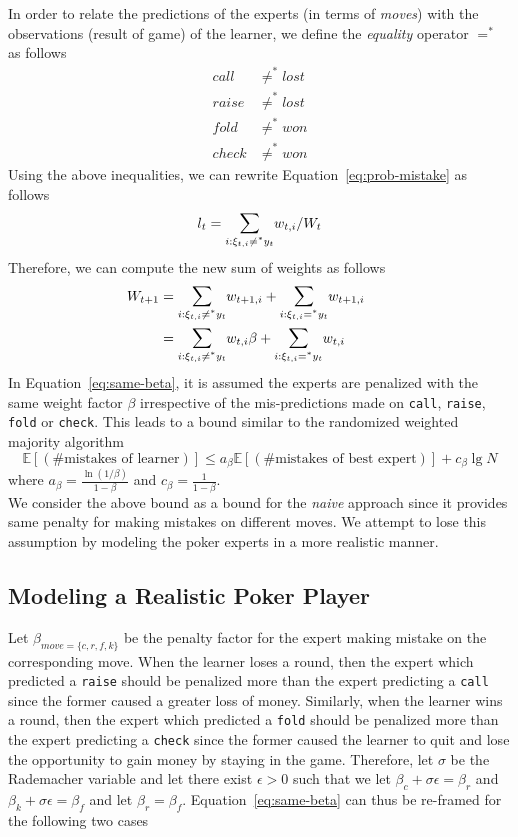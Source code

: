 \documentclass[12pt]{article}
\begin{document}
\noindent In order to relate the predictions of the experts (in terms of {\em moves}) with the
observations (result of game) of the learner, we define the {\em equality} operator
$=^*$ as follows
\begin{align*}
call &\neq^* lost\\
raise &\neq^* lost\\
fold &\neq^* won\\
check &\neq^* won
\end{align*}
\noindent Using the above inequalities, we can rewrite Equation~\ref{eq:prob-mistake} as follows
\begin{align}
l_t = \Sum_{i:\xi_{t,i}\neq^*y_t}w_{t,i}/W_t
\end{align}
\noindent Therefore, we can compute the new sum of weights as follows
\begin{align}
W_{t+1} &= \Sum_{i:\xi_{t,i}\neq^*y_t}w_{t+1,i} + \Sum_{i:\xi_{t,i}=^*y_t}w_{t+1,i}\tag*{}\\
&= \Sum_{i:\xi_{t,i}\neq^*y_t}w_{t,i}\beta + \Sum_{i:\xi_{t,i}=^*y_t}w_{t,i}
\label{eq:same-beta}
\end{align}
\noindent In Equation~\ref{eq:same-beta}, it is assumed the experts are penalized with the same
weight factor $\beta$ irrespective of the mis-predictions made on \texttt{call}, \texttt{raise},
\texttt{fold} or \texttt{check}. This leads to a bound similar to the randomized weighted
majority algorithm \ie
\[\mathbb{E}[(\#\text{mistakes of learner})]\leq a_{\beta}\mathbb{E}[(\#\text{mistakes of best expert})]
+ c_{\beta}\lg N\] where $a_{\beta}=\frac{\ln(1/\beta)}{1-\beta}$ and $c_{\beta}=\frac{1}{1-\beta}$.\\

\noindent We consider the above bound as a bound for the {\em naive} approach since it provides
same penalty for making mistakes on different moves. We attempt to lose this assumption by
modeling the poker experts in a more realistic manner.

\subsection{Modeling a Realistic Poker Player}
Let $\beta_{move=\{c, r, f, k\}}$ be the
penalty factor for the expert making mistake on the corresponding move. When the learner loses
a round, then the expert which predicted a \texttt{raise} should be penalized more than the expert
predicting a \texttt{call} since the former caused a greater loss of money. Similarly, when the learner
wins a round, then the expert which predicted a \texttt{fold} should be penalized more than the expert
predicting a \texttt{check} since the former caused the learner to quit and lose the opportunity to gain
money by staying in the game. Therefore, let $\sigma$ be the Rademacher variable and
let there exist $\epsilon>0$ such that we let $\beta_c + \sigma\epsilon
= \beta_r$ and $\beta_k + \sigma\epsilon = \beta_f$ and let $\beta_r = \beta_f$.
Equation~\ref{eq:same-beta} can thus be re-framed for the following two cases
\end{document}
